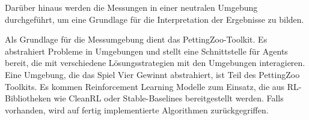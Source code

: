 Darüber hinaus werden die Messungen in einer neutralen Umgebung durchgeführt, um eine Grundlage für die Interpretation der Ergebnisse zu bilden.

Als Grundlage für die Messumgebung dient das PettingZoo-Toolkit. Es abstrahiert Probleme in Umgebungen und stellt eine Schnittstelle für Agents bereit, die mit verschiedene Lösungsstrategien mit den Umgebungen interagieren. Eine Umgebung, die das Spiel Vier Gewinnt abstrahiert, ist Teil des PettingZoo Toolkits. Es kommen Reinforcement Learning Modelle zum Einsatz, die aus RL-Bibliotheken wie CleanRL oder Stable-Baselines bereitgestellt werden. Falls vorhanden, wird auf fertig implementierte Algorithmen zurückgegriffen.